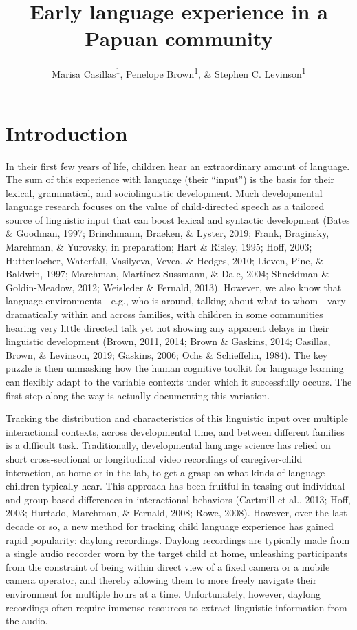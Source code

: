 \documentclass[,man,floatsintext]{apa6}
\title{Early language experience in a Papuan community}
\author{Marisa Casillas\textsuperscript{1}, Penelope Brown\textsuperscript{1},
\& Stephen C. Levinson\textsuperscript{1}}
\date{}
\affiliation{
\vspace{0.5cm}
\textsuperscript{1} Max Planck Institute for Psycholinguistics}
\begin{document}
\maketitle

\section{Introduction}\label{intro}

In their first few years of life, children hear an extraordinary amount
of language. The sum of this experience with language (their
\enquote{input}) is the basis for their lexical, grammatical, and
sociolinguistic development. Much developmental language research
focuses on the value of child-directed speech as a tailored source of
linguistic input that can boost lexical and syntactic development (Bates
\& Goodman, 1997; Brinchmann, Braeken, \& Lyster, 2019; Frank,
Braginsky, Marchman, \& Yurovsky, in preparation; Hart \& Risley, 1995;
Hoff, 2003; Huttenlocher, Waterfall, Vasilyeva, Vevea, \& Hedges, 2010;
Lieven, Pine, \& Baldwin, 1997; Marchman, Martínez-Sussmann, \& Dale,
2004; Shneidman \& Goldin-Meadow, 2012; Weisleder \& Fernald, 2013).
However, we also know that language environments---e.g., who is around,
talking about what to whom---vary dramatically within and across
families, with children in some communities hearing very little directed
talk yet not showing any apparent delays in their linguistic development
(Brown, 2011, 2014; Brown \& Gaskins, 2014; Casillas, Brown, \&
Levinson, 2019; Gaskins, 2006; Ochs \& Schieffelin, 1984). The key
puzzle is then unmasking how the human cognitive toolkit for language
learning can flexibly adapt to the variable contexts under which it
successfully occurs. The first step along the way is actually
documenting this variation.

Tracking the distribution and characteristics of this linguistic input
over multiple interactional contexts, across developmental time, and
between different families is a difficult task. Traditionally,
developmental language science has relied on short cross-sectional or
longitudinal video recordings of caregiver-child interaction, at home or
in the lab, to get a grasp on what kinds of language children typically
hear. This approach has been fruitful in teasing out individual and
group-based differences in interactional behaviors (Cartmill et al.,
2013; Hoff, 2003; Hurtado, Marchman, \& Fernald, 2008; Rowe, 2008).
However, over the last decade or so, a new method for tracking child
language experience has gained rapid popularity: daylong recordings.
Daylong recordings are typically made from a single audio recorder worn
by the target child at home, unleashing participants from the constraint
of being within direct view of a fixed camera or a mobile camera
operator, and thereby allowing them to more freely navigate their
environment for multiple hours at a time. Unfortunately, however,
daylong recordings often require immense resources to extract linguistic
information from the audio.
\end{document}
